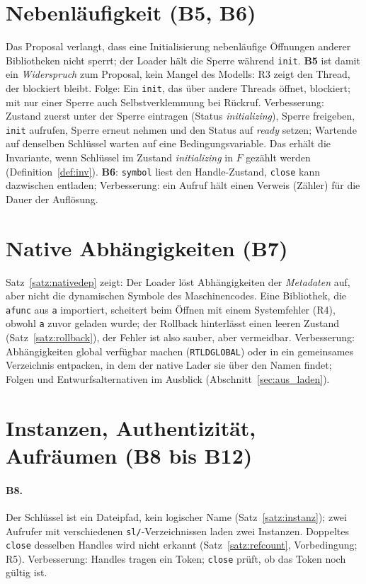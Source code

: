 \documentclass[a4paper,12pt,twoside]{report}
\DeclareRobustCommand{\_}{\ifmmode\mbox{\textunderscore}\else\textunderscore\allowbreak{}\fi}
\theoremstyle{definition}
\newcommand{\Bf}[1]{\textbf{B#1}}
\begin{document}
\section{Nebenläufigkeit (\Bf{5}, \Bf{6})}
Das Proposal verlangt, dass eine Initialisierung nebenläufige Öffnungen anderer Bibliotheken nicht sperrt; der Loader hält die Sperre während \texttt{init}. \Bf{5} ist damit ein \emph{Widerspruch} zum Proposal, kein Mangel des Modells: R3 zeigt den Thread, der blockiert bleibt. Folge: Ein \texttt{init}, das über andere Threads öffnet, blockiert; mit nur einer Sperre auch Selbstverklemmung bei Rückruf. Verbesserung: Zustand zuerst unter der Sperre eintragen (Status \emph{initializing}), Sperre freigeben, \texttt{init} aufrufen, Sperre erneut nehmen und den Status auf \emph{ready} setzen; Wartende auf denselben Schlüssel warten auf eine Bedingungsvariable. Das erhält die Invariante, wenn Schlüssel im Zustand \emph{initializing} in $F$ gezählt werden (Definition~\ref{def:inv}). \Bf{6}: \texttt{symbol} liest den Handle-Zustand, \texttt{close} kann dazwischen entladen; Verbesserung: ein Aufruf hält einen Verweis (Zähler) für die Dauer der Auflösung.

\section{Native Abhängigkeiten (\Bf{7})}
Satz~\ref{satz:nativedep} zeigt: Der Loader löst Abhängigkeiten der \emph{Metadaten} auf, aber nicht die dynamischen Symbole des Maschinencodes. Eine Bibliothek, die \texttt{a\_func} aus \texttt{a} importiert, scheitert beim Öffnen mit einem Systemfehler (R4), obwohl \texttt{a} zuvor geladen wurde; der Rollback hinterlässt einen leeren Zustand (Satz~\ref{satz:rollback}), der Fehler ist also sauber, aber vermeidbar. Verbesserung: Abhängigkeiten global verfügbar machen (\texttt{RTLD\_GLOBAL}) oder in ein gemeinsames Verzeichnis entpacken, in dem der native Lader sie über den Namen findet; Folgen und Entwurfsalternativen im Ausblick (Abschnitt~\ref{sec:aus_laden}).

\section{Instanzen, Authentizität, Aufräumen (\Bf{8} bis \Bf{12})}
\paragraph{\Bf{8}.} Der Schlüssel ist ein Dateipfad, kein logischer Name (Satz~\ref{satz:instanz}); zwei Aufrufer mit verschiedenen \texttt{sl/}-Verzeichnissen laden zwei Instanzen. Doppeltes \texttt{close} desselben Handles wird nicht erkannt (Satz~\ref{satz:refcount}, Vorbedingung; R5). Verbesserung: Handles tragen ein Token; \texttt{close} prüft, ob das Token noch gültig ist.
\end{document}
